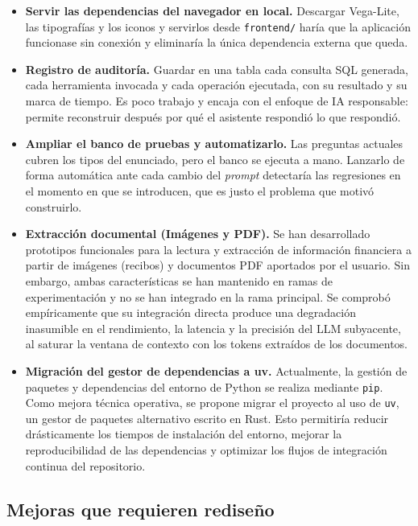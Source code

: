 \begin{itemize}
    \item \textbf{Servir las dependencias del navegador en local.} Descargar
    Vega-Lite, las tipografías y los iconos y servirlos desde
    \texttt{frontend/} haría que la aplicación funcionase sin conexión y
    eliminaría la única dependencia externa que queda.

    \item \textbf{Registro de auditoría.} Guardar en una tabla cada consulta
    SQL generada, cada herramienta invocada y cada operación ejecutada, con su
    resultado y su marca de tiempo. Es poco trabajo y encaja con el enfoque de
    IA responsable: permite reconstruir después por qué el asistente respondió
    lo que respondió.

    \item \textbf{Ampliar el banco de pruebas y automatizarlo.} Las preguntas
    actuales cubren los tipos del enunciado, pero el banco se ejecuta a mano.
    Lanzarlo de forma automática ante cada cambio del \textit{prompt} detectaría
    las regresiones en el momento en que se introducen, que es justo el problema
    que motivó construirlo.

    \item \textbf{Extracción documental (Imágenes y PDF).} Se han desarrollado prototipos 
    funcionales para la lectura y extracción de información financiera a partir de imágenes 
    (recibos) y documentos PDF aportados por el usuario. Sin embargo, ambas características 
    se han mantenido en ramas de experimentación y no se han integrado en la rama principal. 
    Se comprobó empíricamente que su integración directa produce una degradación inasumible en 
    el rendimiento, la latencia y la precisión del LLM subyacente, al saturar la ventana de 
    contexto con los tokens extraídos de los documentos.

    \item \textbf{Migración del gestor de dependencias a uv.} Actualmente, la gestión de 
    paquetes y dependencias del entorno de Python se realiza mediante \texttt{pip}. Como mejora 
    técnica operativa, se propone migrar el proyecto al uso de \texttt{uv}, un gestor de paquetes 
    alternativo escrito en Rust. Esto permitiría reducir drásticamente los tiempos de instalación 
    del entorno, mejorar la reproducibilidad de las dependencias y optimizar los flujos de 
    integración continua del repositorio.


\end{itemize}

\subsection{Mejoras que requieren rediseño}

